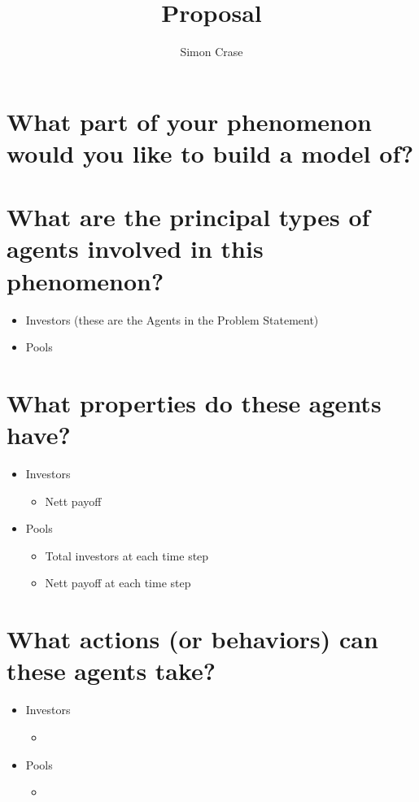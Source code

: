 \documentclass[]{article}
\title{Proposal}
\author{Simon Crase}
\begin{document}
\maketitle

\begin{abstract}

\end{abstract}


 
\section{What part of your phenomenon would you like to build a model of?}

\section{What are the principal types of agents involved in this phenomenon?}
\begin{itemize}
	\item Investors (these are the Agents in the Problem Statement)
	\item Pools
\end{itemize}
\section{What properties do these agents have?}
\begin{itemize}
	\item Investors
	\begin{itemize}
		\item Nett payoff
	\end{itemize}
	\item Pools
	\begin{itemize}
		\item Total investors at each time step
		\item Nett payoff at each time step
	\end{itemize}
\end{itemize}
\section{What actions (or behaviors) can these agents take?}

\begin{itemize}
	\item Investors
	\begin{itemize}
		\item 
	\end{itemize}
	\item Pools
	\begin{itemize}
		\item 
	\end{itemize}
\end{itemize}
\end{document}
